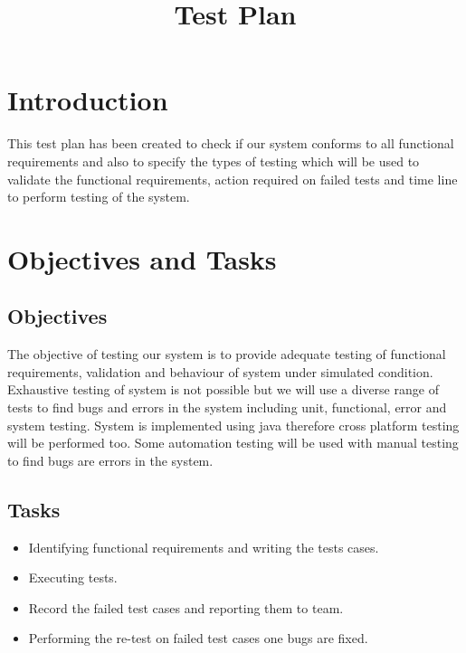 \documentclass[11pt, oneside]{article}   	%
\title{Test Plan}
\author{}
\begin{document}
\maketitle
\section{Introduction}
This test plan has been created to check if our system conforms to all functional requirements and also to specify the types of testing which will be used to validate the functional requirements, action required on failed tests and time line to perform testing of the system.
\section{Objectives and Tasks}
\subsection{Objectives}
The objective of testing our system is to provide adequate testing of functional requirements, validation and behaviour of system under simulated condition. Exhaustive testing of system is not possible but we will use a diverse range of tests to find bugs and errors in the system including unit, functional, error and system testing. System is implemented using java therefore cross platform testing will be performed too. Some automation testing will be used with manual testing to find bugs are errors in the system.
\subsection{Tasks}
\begin{itemize}
\item Identifying functional requirements and writing the tests cases.
\item Executing tests.
\item Record the failed test cases and reporting them to team.
\item Performing the re-test on failed test cases one bugs are fixed.
\end{itemize}
\end{document}
